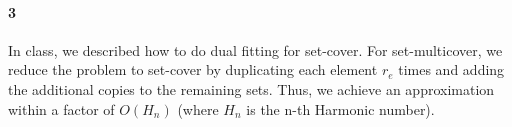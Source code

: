 \documentclass{article}
\begin{document}
\paragraph{3} 
In class, we described how to do dual fitting for set-cover.  For set-multicover, we reduce the problem to set-cover by duplicating each element $r_e$ times and adding the additional copies to the remaining sets.  Thus, we achieve an approximation within a factor of $O(H_n)$ (where $H_n$ is the n-th Harmonic number).
\end{document}

